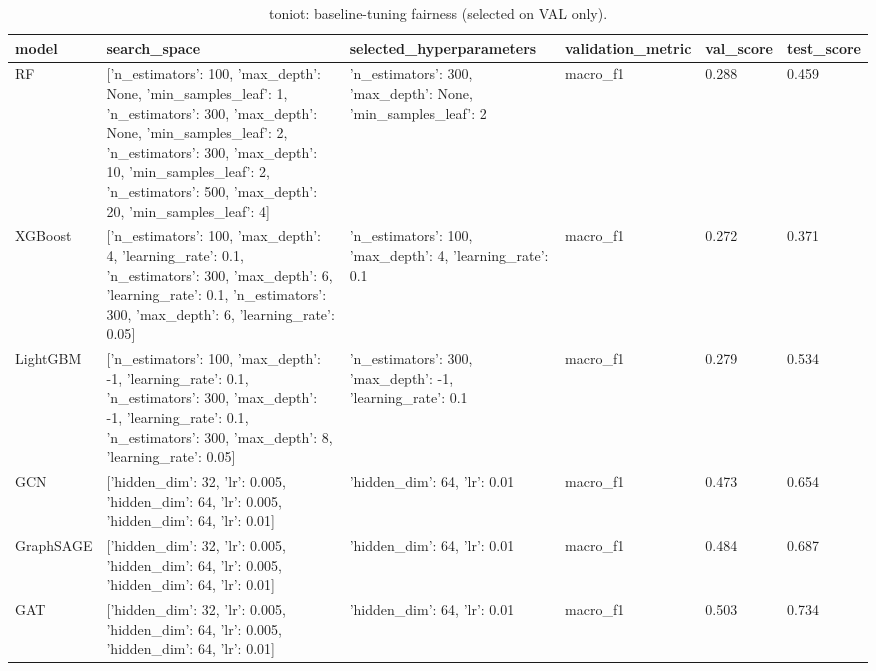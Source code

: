 \begin{table}[t]
\centering
\caption{toniot: baseline-tuning fairness (selected on VAL only).}
\label{tab:toniot_baseline_tuning}
\begin{tabular}{llllll}
\toprule
model & search\_space & selected\_hyperparameters & validation\_metric & val\_score & test\_score \\
\midrule
RF & [{'n\_estimators': 100, 'max\_depth': None, 'min\_samples\_leaf': 1}, {'n\_estimators': 300, 'max\_depth': None, 'min\_samples\_leaf': 2}, {'n\_estimators': 300, 'max\_depth': 10, 'min\_samples\_leaf': 2}, {'n\_estimators': 500, 'max\_depth': 20, 'min\_samples\_leaf': 4}] & {'n\_estimators': 300, 'max\_depth': None, 'min\_samples\_leaf': 2} & macro\_f1 & 0.288 & 0.459 \\
XGBoost & [{'n\_estimators': 100, 'max\_depth': 4, 'learning\_rate': 0.1}, {'n\_estimators': 300, 'max\_depth': 6, 'learning\_rate': 0.1}, {'n\_estimators': 300, 'max\_depth': 6, 'learning\_rate': 0.05}] & {'n\_estimators': 100, 'max\_depth': 4, 'learning\_rate': 0.1} & macro\_f1 & 0.272 & 0.371 \\
LightGBM & [{'n\_estimators': 100, 'max\_depth': -1, 'learning\_rate': 0.1}, {'n\_estimators': 300, 'max\_depth': -1, 'learning\_rate': 0.1}, {'n\_estimators': 300, 'max\_depth': 8, 'learning\_rate': 0.05}] & {'n\_estimators': 300, 'max\_depth': -1, 'learning\_rate': 0.1} & macro\_f1 & 0.279 & 0.534 \\
GCN & [{'hidden\_dim': 32, 'lr': 0.005}, {'hidden\_dim': 64, 'lr': 0.005}, {'hidden\_dim': 64, 'lr': 0.01}] & {'hidden\_dim': 64, 'lr': 0.01} & macro\_f1 & 0.473 & 0.654 \\
GraphSAGE & [{'hidden\_dim': 32, 'lr': 0.005}, {'hidden\_dim': 64, 'lr': 0.005}, {'hidden\_dim': 64, 'lr': 0.01}] & {'hidden\_dim': 64, 'lr': 0.01} & macro\_f1 & 0.484 & 0.687 \\
GAT & [{'hidden\_dim': 32, 'lr': 0.005}, {'hidden\_dim': 64, 'lr': 0.005}, {'hidden\_dim': 64, 'lr': 0.01}] & {'hidden\_dim': 64, 'lr': 0.01} & macro\_f1 & 0.503 & 0.734 \\
\bottomrule
\end{tabular}
\end{table}
